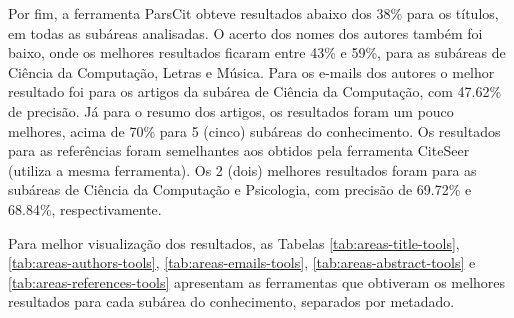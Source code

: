 Por fim, a ferramenta ParsCit obteve resultados abaixo dos 38\% para os títulos, em todas as subáreas analisadas. 
O acerto dos nomes dos autores também foi baixo, onde os melhores resultados ficaram entre 43\% e 59\%, para as subáreas de Ciência da Computação, Letras e Música. 
Para os e-mails dos autores o melhor resultado foi para os artigos da subárea de Ciência da Computação, com 47.62\% de precisão. 
Já para o resumo dos artigos, os resultados foram um pouco melhores, acima de 70\% para 5 (cinco) subáreas do conhecimento. 
Os resultados para as referências foram semelhantes aos obtidos pela ferramenta CiteSeer (utiliza a mesma ferramenta). 
Os 2 (dois) melhores resultados foram para as subáreas de Ciência da Computação e Psicologia, com precisão de 69.72\% e 68.84\%, respectivamente.

Para melhor visualização dos resultados, as Tabelas \ref{tab:areas-title-tools}, \ref{tab:areas-authors-tools}, \ref{tab:areas-emails-tools}, \ref{tab:areas-abstract-tools} e \ref{tab:areas-references-tools} 
apresentam as ferramentas que obtiveram os melhores resultados para cada subárea do conhecimento, separados por metadado. 

